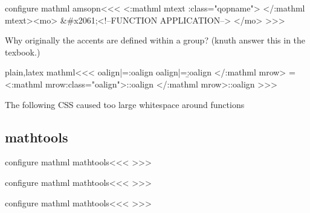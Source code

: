 {{{{{{\<configure mathml amsopn\><<<
   {
      {<\a:mathml mtext \mml:class="qopname">}
  {</\a:mathml mtext><mo> &\#x2061;<!--FUNCTION APPLICATION--> </mo>}
      {}}
>>>




Why originally the accents are defined within a group? (knuth answer
this in the texbook.)

\<plain,latex mathml\><<<
\let\A:oalign|=\a:oalign
\let\B:oalign|=\b:oalign
   {\ifmmode {}%
                          {\Tg</\a:mathml mrow>}{}%
             \let\halign|=\TeXhalign
             \Tg<\a:mathml mrow\Hnewline \mml:class="oalign">\else\A:oalign
    \fi}
   {\ifmmode \Tg</\a:mathml mrow>\else\B:oalign\fi}
>>>



The following CSS caused too large whitespace around functions


\subsection{mathtools}

\<configure mathml mathtools\><<<
   {} 
   {} 
   {}    {} 
   {}   {} 
>>>

\<configure mathml mathtools\><<<
    {%
        {}
        {}
        {}    {}
        {}   {}%
    }
    {}{}{}
>>>

\<configure mathml mathtools\><<<
    {%
        {}
        {}
        {}    {}
        {}   {}%
    }
    {}{}{}
>>>


}}}}}}
